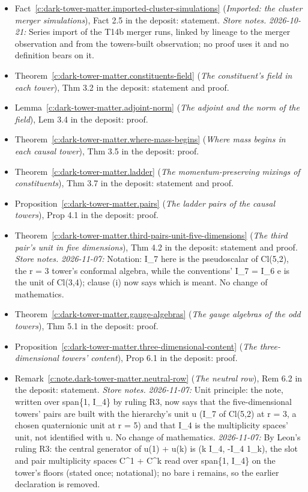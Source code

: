 \documentclass[11pt]{article}
\theoremstyle{definition}
\theoremstyle{plain}
\begin{document}
\begin{itemize}
\item Fact~\ref{c:dark-tower-matter.imported-cluster-simulations} (\emph{Imported: the cluster merger simulations}), Fact 2.5 in the deposit: statement. \emph{Store notes.} \emph{2026-10-21:} Series import of the T14b merger runs, linked by lineage to the merger observation and from the towers-built observation; no proof uses it and no definition bears on it.
\item Theorem~\ref{c:dark-tower-matter.constituents-field} (\emph{The constituent's field in each tower}), Thm 3.2 in the deposit: statement and proof.
\item Lemma~\ref{c:dark-tower-matter.adjoint-norm} (\emph{The adjoint and the norm of the field}), Lem 3.4 in the deposit: proof.
\item Theorem~\ref{c:dark-tower-matter.where-mass-begins} (\emph{Where mass begins in each causal tower}), Thm 3.5 in the deposit: proof.
\item Theorem~\ref{c:dark-tower-matter.ladder} (\emph{The momentum-preserving mixings of constituents}), Thm 3.7 in the deposit: statement and proof.
\item Proposition~\ref{c:dark-tower-matter.pairs} (\emph{The ladder pairs of the causal towers}), Prop 4.1 in the deposit: proof.
\item Theorem~\ref{c:dark-tower-matter.third-pairs-unit-five-dimensions} (\emph{The third pair's unit in five dimensions}), Thm 4.2 in the deposit: statement and proof. \emph{Store notes.} \emph{2026-11-07:} Notation: I\_7 here is the pseudoscalar of Cl(5,2), the r = 3 tower's conformal algebra, while the conventions' I\_7 = I\_6 e is the unit of Cl(3,4); clause (i) now says which is meant. No change of mathematics.
\item Theorem~\ref{c:dark-tower-matter.gauge-algebras} (\emph{The gauge algebras of the odd towers}), Thm 5.1 in the deposit: proof.
\item Proposition~\ref{c:dark-tower-matter.three-dimensional-content} (\emph{The three-dimensional towers' content}), Prop 6.1 in the deposit: proof.
\item Remark~\ref{c:note.dark-tower-matter.neutral-row} (\emph{The neutral row}), Rem 6.2 in the deposit: statement. \emph{Store notes.} \emph{2026-11-07:} Unit principle: the note, written over span\{1, I\_4\} by ruling R3, now says that the five-dimensional towers' pairs are built with the hierarchy's unit u (I\_7 of Cl(5,2) at r = 3, a chosen quaternionic unit at r = 5) and that I\_4 is the multiplicity spaces' unit, not identified with u. No change of mathematics. \emph{2026-11-07:} By Leon's ruling R3: the central generator of u(1) + u(k) is (k I\_4, -I\_4 1\_k), the slot and pair multiplicity spaces C\^{}1 + C\^{}k read over span\{1, I\_4\} on the tower's floors (stated once; notational); no bare i remains, so the earlier declaration is removed.

\end{itemize}
\end{document}
